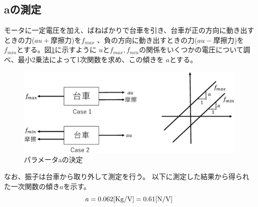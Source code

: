 \subsection{aの測定}
	モータに一定電圧を加え、ばねばかりで台車を引き、台車が正の方向に動き出すときの力($au+摩擦力$)を$f_{max}$
	、負の方向に動き出すときの力($au-摩擦力$)を$f_{min}$とする。図\ref{image:parameterA}に示すように
	$u$と$f_{max},f_{min}$の関係をいくつかの電圧について調べ、最小2乗法によって1次関数を求め、この傾きを
	$a$とする。\cite{Koga:Binpe}
	\begin{figure}[H]
		\centering
		\includegraphics[width=1.0\linewidth]{gazo/ParameterA.eps}
		\caption{パラメータaの決定}
		\label{image:parameterA}
	\end{figure}
	なお、振子は台車から取り外して測定を行う。
	以下に測定した結果から得られた一次関数の傾き$a$を示す。
	\[
		a=0.062[\rm{Kg/V}] = 0.61[\rm{N/V}]
	\]
	
